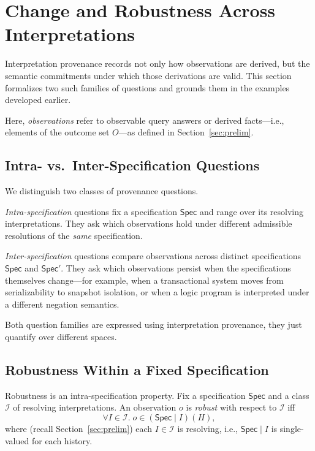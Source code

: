 \documentclass[acmsmall,nonacm]{acmart}
\theoremstyle{remark}
\numberwithin{definition}{section}
\numberwithin{theorem}{section}
\numberwithin{lemma}{section}
\numberwithin{corollary}{section}
\numberwithin{remark}{section}
\numberwithin{example}{section}
\numberwithin{observation}{section}
\numberwithin{assumption}{section}
\newcommand{\Spec}{\mathsf{Spec}}
\begin{document}
\section{Change and Robustness Across Interpretations}
\label{sec:robustness}

Interpretation provenance records not only how observations are derived, but the
semantic commitments under which those derivations are valid.
This section formalizes two such families of questions and grounds them in the
examples developed earlier.

Here, \emph{observations} refer to observable query answers or derived facts—i.e., elements of the outcome set $O$—as defined in Section~\ref{sec:prelim}.

\subsection{Intra- vs.\ Inter-Specification Questions}

We distinguish two classes of provenance questions.

\emph{Intra-specification} questions fix a specification $\Spec$ and range over its
resolving interpretations.
They ask which observations hold under different admissible resolutions
of the \emph{same} specification.

\emph{Inter-specification} questions compare observations across distinct
specifications $\Spec$ and $\Spec'$.
They ask which observations persist when the specifications themselves change---for
example, when a transactional system moves from serializability to snapshot
isolation, or when a logic program is interpreted under a different negation
semantics.

Both question families are expressed using interpretation provenance, they
just quantify over different spaces.

\subsection{Robustness Within a Fixed Specification}

Robustness is an intra-specification property.
Fix a specification $\Spec$ and a class $\mathcal{I}$ of resolving interpretations.
An observation $o$ is \emph{robust} with respect to $\mathcal{I}$ iff
\[
  \forall I \in \mathcal{I}.\; o \in (\Spec \mid I)(H),
\]
where (recall Section~\ref{sec:prelim}) each $I \in \mathcal{I}$ is resolving, i.e., $\Spec \mid I$ is single-valued for each history.
\end{document}
